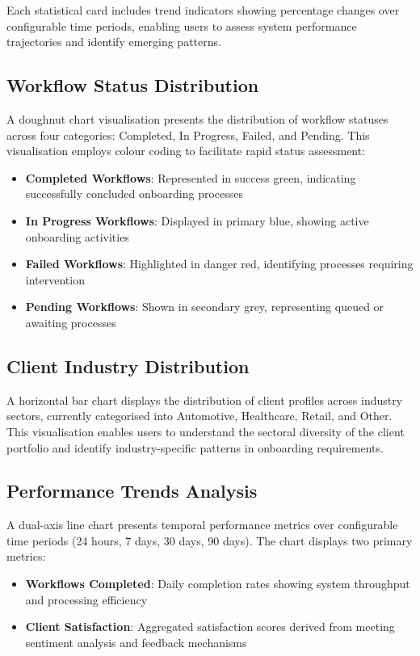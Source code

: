 \documentclass{article}
\begin{document}
Each statistical card includes trend indicators showing percentage changes over configurable time periods, enabling users to assess system performance trajectories and identify emerging patterns.

\subsection{Workflow Status Distribution}
A doughnut chart visualisation presents the distribution of workflow statuses across four categories: Completed, In Progress, Failed, and Pending. This visualisation employs colour coding to facilitate rapid status assessment:

\begin{itemize}
    \item \textbf{Completed Workflows}: Represented in success green, indicating successfully concluded onboarding processes
    \item \textbf{In Progress Workflows}: Displayed in primary blue, showing active onboarding activities
    \item \textbf{Failed Workflows}: Highlighted in danger red, identifying processes requiring intervention
    \item \textbf{Pending Workflows}: Shown in secondary grey, representing queued or awaiting processes
\end{itemize}

\subsection{Client Industry Distribution}
A horizontal bar chart displays the distribution of client profiles across industry sectors, currently categorised into Automotive, Healthcare, Retail, and Other. This visualisation enables users to understand the sectoral diversity of the client portfolio and identify industry-specific patterns in onboarding requirements.

\subsection{Performance Trends Analysis}
A dual-axis line chart presents temporal performance metrics over configurable time periods (24 hours, 7 days, 30 days, 90 days). The chart displays two primary metrics:

\begin{itemize}
    \item \textbf{Workflows Completed}: Daily completion rates showing system throughput and processing efficiency
    \item \textbf{Client Satisfaction}: Aggregated satisfaction scores derived from meeting sentiment analysis and feedback mechanisms
\end{itemize}
\end{document}
